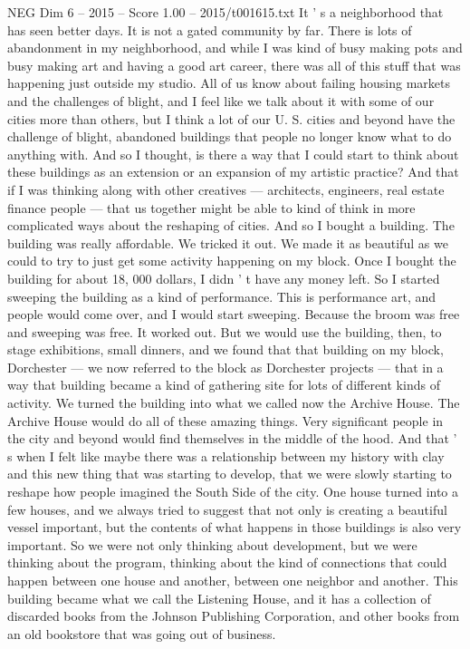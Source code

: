 \begin{textsample}{NEG Dim 6 – 2015 – Score 1.00 – 2015/t001615.txt}
It ' s a neighborhood that has seen better days.
It is not a gated community by far.
There is lots of abandonment in my neighborhood, and while I was kind of busy making pots and busy making art and having a good art career, there was all of this stuff that was happening just outside my studio.
All of us know about failing housing markets and the challenges of blight, and I feel like we talk about it with some of our cities more than others, but I think a lot of our U.
S. cities and beyond have the challenge of blight, abandoned buildings that people no longer know what to do anything with.
And so I thought, is there a way that I could start to think about these buildings as an extension or an expansion of my artistic practice?
And that if I was thinking along with other creatives — architects, engineers, real estate finance people — that us together might be able to kind of think in more complicated ways about the reshaping of cities.
And so I bought a building.
The building was really affordable.
We tricked it out.
We made it as beautiful as we could to try to just get some activity happening on my block.
Once I bought the building for about 18, 000 dollars, I didn ' t have any money left.
So I started sweeping the building as a kind of performance.
This is performance art, and people would come over, and I would start sweeping.
Because the broom was free and sweeping was free.
It worked out.
But we would use the building, then, to stage exhibitions, small dinners, and we found that that building on my block, Dorchester — we now referred to the block as Dorchester projects — that in a way that building became a kind of gathering site for lots of different kinds of activity.
We turned the building into what we called now the Archive House.
The Archive House would do all of these amazing things.
Very significant people in the city and beyond would find themselves in the middle of the hood.
And that ' s when I felt like maybe there was a relationship between my history with clay and this new thing that was starting to develop, that we were slowly starting to reshape how people imagined the South Side of the city.
One house turned into a few houses, and we always tried to suggest that not only is creating a beautiful vessel important, but the contents of what happens in those buildings is also very important.
So we were not only thinking about development, but we were thinking about the program, thinking about the kind of connections that could happen between one house and another, between one neighbor and another.
This building became what we call the Listening House, and it has a collection of discarded books from the Johnson Publishing Corporation, and other books from an old bookstore that was going out of business.

\end{textsample}
